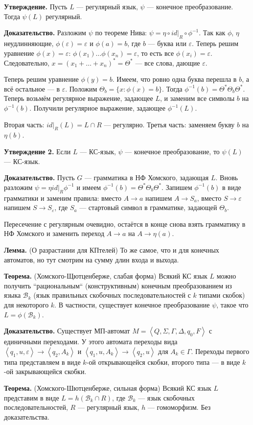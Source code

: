 \textbf{Утверждение.} Пусть $L$ --- регулярный язык, $\psi$ --- конечное преобразование.
Тогда $\psi(L)$ регулярный.

\textbf{Доказательство.} Разложим $\psi$ по теореме Нива: $\psi = \eta \circ id|_R \circ \phi^{-1}$.
Так как $\phi$, $\eta$ неудлинняющие, $\phi(\varepsilon) = \varepsilon$ и $\phi(a) = b$, где $b$ --- буква или $\varepsilon$.
Теперь решим уравнение $\phi(x) = \varepsilon$: $\phi(x_1) \dots \phi(x_n) = \varepsilon$, то есть все $\phi(x_i) = \varepsilon$.
Следовательно, $x = (x_1 + \dots + x_n)^* = \Theta^*$ --- все слова, дающие $\varepsilon$.

Теперь решим уравнение $\phi(y) = b$. Имеем, что ровно одна буква перешла в $b$, а всё остальное --- в $\varepsilon$.
Положим $\Theta_b = \{x: \phi(x) = b\}$. Тогда $\phi^{-1}(b) = \Theta^* \Theta_b \Theta^*$.
Теперь возьмём регулярное выражение, задающее $L$, и заменим все символы $b$ на $\phi^{-1}(b)$.
Получили регулярное выражение, задающее $\phi^{-1}(L)$.

Вторая часть: $id|_R(L) = L \cap R$ --- регулярно.
Третья часть: заменяем букву $b$ на $\eta(b)$.

\textbf{Утверждение 2.} Если $L$ --- КС-язык, $\psi$ --- конечное преобразование, то $\psi(L)$ --- КС-язык.

\textbf{Доказательство.} Пусть $G$ --- грамматика в НФ Хомского, задающая $L$.
Вновь разложим $\psi = \eta id|_R \phi^{-1}$ и имеем $\phi^{-1}(b) = \Theta^* \Theta_b \Theta^*$.
Запишем $\phi^{-1}(b)$ в виде грамматики и заменим правила: вместо $A \to a$ напишем $A \to S_a$, вместо $S \to \varepsilon$ напишем $S \to S_{\varepsilon}$, где $S_a$ --- стартовый символ в грамматике, задающей $\Theta_b$.

Пересечение с регулярным очевидно, остаётся в конце снова взять грамматику в НФ Хомского и заменить переход $A \to a$ на $A \to \eta(a)$.

\textbf{Лемма.} (О разрастании для КПтелей) То же самое, что и для конечных автоматов, но тут смотрим на сумму длин входа и выхода.

\textbf{Теорема.} (Хомского-Щютценберже, слабая форма) Всякий КС язык $L$ можно получить ``рациональным`` (конструктивным) конечным преобразованием из языка $\mathcal B_k$ (язык правильных скобочных последовательностей с $k$ типами скобок) для некоторого $k$.
В частности, существует конечное преобразование $\psi$, такое что $L = \phi(\mathcal B_k)$.

\textbf{Доказательство.} Существует МП-автомат $M = \left<Q, \Sigma, \Gamma, \Delta, q_0, F \right>$ с единичными переходами.
У этого автомата переходы вида $\left< q_1, u, \varepsilon \right> \to \left< q_2, A_k \right>$ и $\left< q_1, u, A_k \right> \to \left< q_2, u \right>$ для $A_k \in \Gamma$.
Переходы первого типа представляем в виде $k$-ой открывающейся скобки, второго типа --- в виде $k$-ой закрывающейся скобки.

\textbf{Теорема.} (Хомского-Шютценберже, сильная форма) Всякий КС язык $L$ представим в виде $L = h(\mathcal B_k \cap R)$, где $\mathcal B_k$ --- язык скобочных последовательностей, $R$ --- регулярный язык, $h$ --- гомоморфизм.
Без доказательства.
